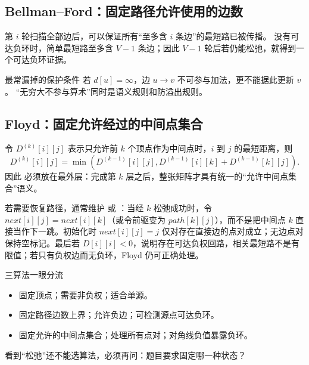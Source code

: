 \documentclass[UTF8,fontset=none,11pt,a4paper]{ctexart}
\begin{document}


\subsection{Bellman--Ford：固定路径允许使用的边数}
第 $i$ 轮扫描全部边后，可以保证所有“至多含 $i$ 条边”的最短路已被传播。
没有可达负环时，简单最短路至多含 $V-1$ 条边；因此 $V-1$ 轮后若仍能松弛，就得到一个可达负环证据。

\begin{corebox}{最常漏掉的保护条件}
若 $d[u]=\infty$，边 $u\to v$ 不可参与加法，更不能据此更新 $v$。
“无穷大不参与算术”同时是语义规则和防溢出规则。
\end{corebox}



\subsection{Floyd：固定允许经过的中间点集合}
令 $D^{(k)}[i][j]$ 表示只允许前 $k$ 个顶点作为中间点时，$i$ 到 $j$ 的最短距离，则
\[
D^{(k)}[i][j]
=\min\left(D^{(k-1)}[i][j],
D^{(k-1)}[i][k]+D^{(k-1)}[k][j]\right).
\]
因此  必须放在最外层：完成第 $k$ 层之后，整张矩阵才具有统一的“允许中间点集合”语义。

若需要恢复路径，通常维护  或 ：当经 $k$ 松弛成功时，令 $next[i][j]=next[i][k]$（或令前驱变为 $path[k][j]$），而不是把中间点 $k$ 直接当作下一跳。初始化时 $next[i][j]=j$ 仅对存在直接边的点对成立；无边点对保持空标记。最后若 $D[i][i]<0$，说明存在可达负权回路，相关最短路不是有限值；若只有负权边而无负环，Floyd 仍可正确处理。



\begin{methodbox}{三算法一眼分流}
\begin{itemize}
  \item {}固定顶点；需要非负权；适合单源。
  \item {}固定路径边数上界；允许负边；可检测源点可达负环。
  \item {}固定允许的中间点集合；处理所有点对；对角线负值暴露负环。
\end{itemize}
看到“松弛”还不能选算法，必须再问：题目要求固定哪一种状态？
\end{methodbox}
\end{document}
